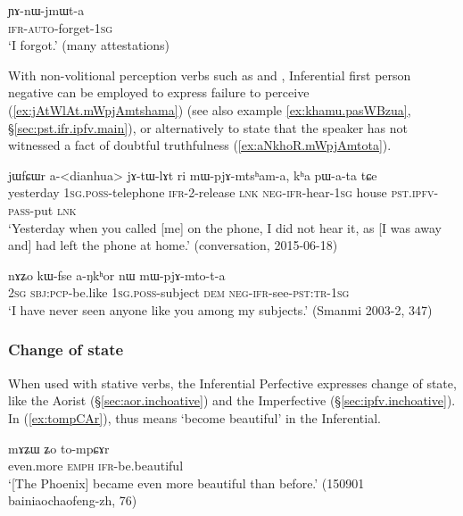 \begin{exe}
\ex \label{ex:YAnWjmWta}
\gll ɲɤ-nɯ-jmɯt-a \\
 \textsc{ifr}-\textsc{auto}-forget-\textsc{1sg} \\
\glt `I forgot.' (many attestations)
\end{exe}


With non-volitional perception verbs such as  and , Inferential first person negative can be employed to express failure to perceive (\ref{ex:jAtWlAt.mWpjAmtshama}) (see also example \ref{ex:khamu.pasWBzua}, §\ref{sec:pst.ifr.ipfv.main}), or alternatively to state that the speaker has not witnessed a fact of doubtful truthfulness (\ref{ex:aNkhoR.mWpjAmtota}).

\begin{exe}
\ex \label{ex:jAtWlAt.mWpjAmtshama}
\gll jɯfɕɯr a-<dianhua> jɤ-tɯ-lɤt ri mɯ-pjɤ-mtsʰam-a, kʰa pɯ-a-ta tɕe  \\
yesterday \textsc{1sg}.\textsc{poss}-telephone  \textsc{ifr}-2-release \textsc{lnk} \textsc{neg}-\textsc{ifr}-hear-\textsc{1sg} house \textsc{pst}.\textsc{ipfv}-\textsc{pass}-put \textsc{lnk} \\
\glt `Yesterday when you called [me] on the phone, I did not hear it, as [I was away and] had left the phone at home.' (conversation, 2015-06-18)
\end{exe}


\begin{exe}
\ex \label{ex:aNkhoR.mWpjAmtota}
\gll nɤʑo kɯ-fse a-ŋkʰor nɯ mɯ-pjɤ-mto-t-a \\
\textsc{2sg} \textsc{sbj}:\textsc{pcp}-be.like \textsc{1sg}.\textsc{poss}-subject \textsc{dem} \textsc{neg}-\textsc{ifr}-see-\textsc{pst}:\textsc{tr}-\textsc{1sg} \\
\glt `I have never seen anyone like you among my subjects.' (Smanmi 2003-2, 347)
\end{exe}


\subsubsection{Change of state}   \label{sec:ifr.inchoative}
When used with stative verbs, the Inferential Perfective expresses change of state, like the Aorist (§\ref{sec:aor.inchoative}) and the Imperfective (§\ref{sec:ipfv.inchoative}). In (\ref{ex:tompCAr}),  thus means `become beautiful' in the Inferential.

\begin{exe}
\ex \label{ex:tompCAr}
\gll mɤʑɯ ʑo to-mpɕɤr \\
even.more \textsc{emph} \textsc{ifr}-be.beautiful \\
\glt `[The Phoenix] became even more beautiful than before.' (150901 bainiaochaofeng-zh, 76)
\end{exe}

